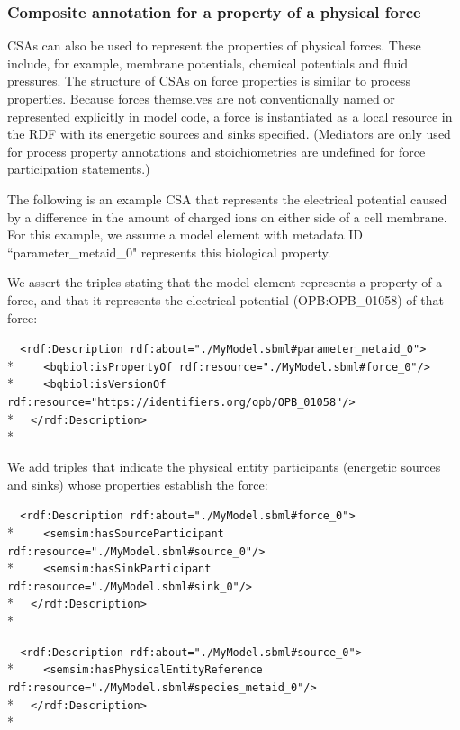\documentclass[pdftex,rgb,dvipsnames,svgnames,hyperref,table]{report}
\begin{document}
\subsubsection{Composite annotation for a property of a physical force}
CSAs can also be used to represent the properties of physical forces. These include, for example, membrane potentials, chemical potentials and fluid pressures. The structure of CSAs on force properties is similar to process properties. Because forces themselves are not conventionally named or represented explicitly in model code, a force is instantiated as a local resource in the RDF with its energetic sources and sinks specified. (Mediators are only used for process property annotations and stoichiometries are undefined for force participation statements.)

The following is an example CSA that represents the electrical potential caused by a difference in the amount of charged ions on either side of a cell membrane. For this example, we assume a model element with metadata ID ``parameter\_metaid\_0" represents this biological property. 

We assert the triples stating that the model element represents a property of a force, and that it represents the electrical potential (OPB:OPB\_01058) of that force:

  \verb|  <rdf:Description rdf:about="./MyModel.sbml#parameter_metaid_0">|\\*
  \verb|    <bqbiol:isPropertyOf rdf:resource="./MyModel.sbml#force_0"/>|\\*
  \verb|    <bqbiol:isVersionOf rdf:resource="https://identifiers.org/opb/OPB_01058"/>|\\*
  \verb|  </rdf:Description>|\\*
  
We add triples that indicate the physical entity participants (energetic sources and sinks) whose properties establish the force:

  \verb|  <rdf:Description rdf:about="./MyModel.sbml#force_0">|\\*
  \verb|    <semsim:hasSourceParticipant rdf:resource="./MyModel.sbml#source_0"/>|\\*
  \verb|    <semsim:hasSinkParticipant rdf:resource="./MyModel.sbml#sink_0"/>|\\*
  \verb|  </rdf:Description>|\\*
  
  \verb|  <rdf:Description rdf:about="./MyModel.sbml#source_0">|\\*
  \verb|    <semsim:hasPhysicalEntityReference rdf:resource="./MyModel.sbml#species_metaid_0"/>|\\*
  \verb|  </rdf:Description>|\\*
  
\end{document}
